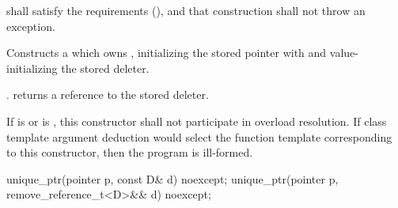 \begin{itemdescr}
\pnum
\requires {} shall
satisfy the  requirements (),
and that construction shall not throw an exception.

\pnum
\effects Constructs a  which owns
, initializing the stored pointer with  and
value-initializing the stored deleter.

\pnum
\ensures {}. 
returns a reference to the stored deleter.

\pnum
\remarks If  is  or
 is ,
this constructor shall not participate in overload resolution.
If class template argument deduction
would select the function template corresponding to this constructor,
then the program is ill-formed.
\end{itemdescr}

%
\begin{itemdecl}
unique_ptr(pointer p, const D& d) noexcept;
unique_ptr(pointer p, remove_reference_t<D>&& d) noexcept;
\end{itemdecl}

